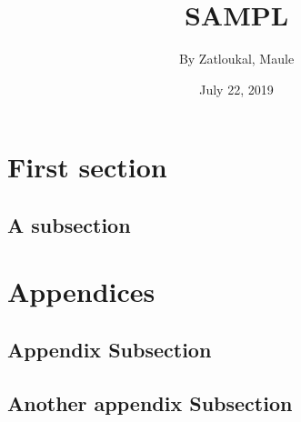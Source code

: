 \documentclass[12pt,onecolumn,a4paper]{report}
\title{\Large{\textbf{SAMPL}}}
\author{By Zatloukal, Maule}
\date{July 22, 2019}
\begin{document}
\maketitle

\tableofcontents

\section{First section}
\subsection{A subsection}
\blindtext[1]

\appendix
\section*{Appendices}
\renewcommand{\thesubsection}{\Alph{subsection}}

\subsection{Appendix Subsection}
\subsection{Another appendix Subsection}
\end{document}
